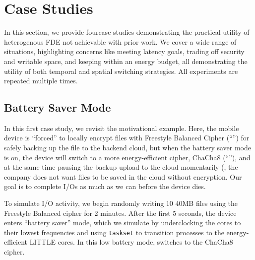 \section{Case Studies}\label{sec:usecases}

In this section, we provide four\xxx case studies demonstrating the practical
utility of heterogenous FDE not achievable with prior work. We cover a wide
range of situations, highlighting concerns like meeting latency goals, trading
off security and writable space, and keeping within an energy budget, all
demonstrating the utility of both temporal and spatial switching strategies. All
experiments are repeated multiple times.


\subsection{Battery Saver Mode}\label{subsec:uc1}

In this first case study, we revisit the motivational example.  Here, the mobile
device is ``forced'' to locally encrypt files with Freestyle Balanced Cipher
(``\cone'') for safely backing up the file to the backend cloud, but when the
battery saver mode is on, the device will switch to a more energy-efficient
cipher, ChaCha8 (``\ctwo''), and at the same time pausing the backup upload to
the cloud momentarily (\eg, the company does not want files to be saved in the
cloud without \cone encryption. Our goal is to complete I/Os as much as we can
before the device dies.

To simulate I/O activity, we begin randomly writing 10 40MB files using the
Freestyle Balanced cipher for 2 minutes.  After the first 5 seconds, the device
enters ``battery saver'' mode, which we simulate by underclocking the cores to
their lowest frequencies and using \texttt{taskset} to transition \sys processes
to the energy-efficient LITTLE cores.  In this low battery mode, \sys switches
to the ChaCha8 cipher.



